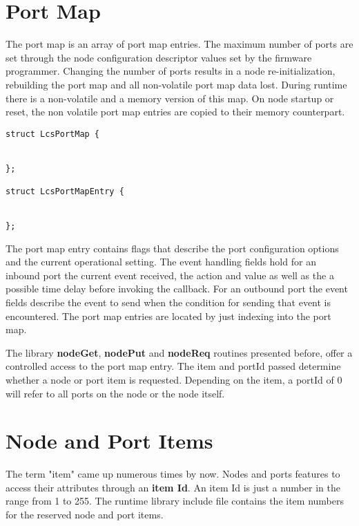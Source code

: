 \section{Port Map}

The port map is an array of port map entries. The maximum number of ports are set through the node configuration descriptor values set by the firmware programmer. Changing the number of ports results in a node re-initialization, rebuilding the port map and all non-volatile port map data lost. During runtime there is a non-volatile and a memory version of this map. On node startup or reset, the non volatile port map entries are copied to their memory counterpart.

\lstset{language=c++, style=codesnippetstyle}

\begin{lstlisting}
struct LcsPortMap {

  
};

struct LcsPortMapEntry {


};
\end{lstlisting}
\FloatBarrier

The port map entry contains flags that describe the port configuration options and the current operational setting. The event handling fields hold for an inbound port the current event received, the action and value as well as the a possible time delay before invoking the callback. For an outbound port the event fields describe the event to send when the condition for sending that event is encountered. The port map entries are located by just indexing into the port map.

The library \textbf{nodeGet}, \textbf{nodePut} and \textbf{nodeReq} routines presented before, offer a controlled access to the port map entry. The item and portId passed determine whether a node or port item is requested. Depending on the item, a portId of 0 will refer to all ports on the node or the node itself.

\section{Node and Port Items}

The term "item" came up numerous times by now. Nodes and ports features to access their attributes through an \textbf{item Id}. An item Id is just a number in the range from 1 to 255. The runtime library include file contains the item numbers for the reserved node and port items.

